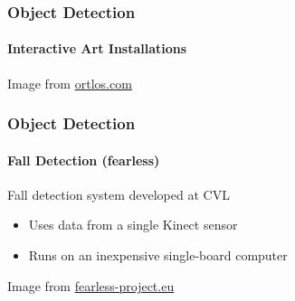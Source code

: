 \documentclass[xetex,professionalfont]{beamer}
\begin{document}

\begin{frame}
\frametitle{Object Detection}
\framesubtitle{Interactive Art Installations}

\begin{center}
    {\centering Image from \url{ortlos.com}}
\end{center}

\end{frame}


\begin{frame}
\frametitle{Object Detection}
\framesubtitle{Fall Detection (fearless)}

Fall detection system developed at CVL
\begin{itemize}
	\item Uses data from a single Kinect sensor
	\item Runs on an inexpensive single-board computer
\end{itemize}

\bigskip
\begin{center}
    {\centering Image from \url{fearless-project.eu}}
\end{center}

\end{frame}

\end{document}
